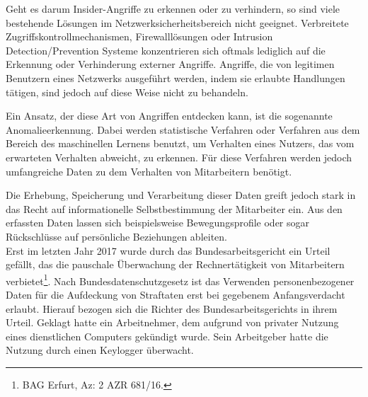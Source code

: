 
Geht es darum Insider-Angriffe zu erkennen oder zu verhindern, so sind viele bestehende Lösungen im Netzwerksicherheitsbereich nicht geeignet. Verbreitete Zugriffskontrollmechanismen, Firewalllösungen oder Intrusion Detection/Prevention Systeme konzentrieren sich oftmals lediglich auf die Erkennung oder Verhinderung externer Angriffe. Angriffe, die von legitimen Benutzern eines Netzwerks ausgeführt werden, indem sie erlaubte Handlungen tätigen, sind jedoch auf diese Weise nicht zu behandeln.

Ein Ansatz, der diese Art von Angriffen entdecken kann, ist die sogenannte Anomalieerkennung. Dabei werden statistische Verfahren oder Verfahren aus dem Bereich des maschinellen Lernens benutzt, um Verhalten eines Nutzers, das vom erwarteten Verhalten abweicht, zu erkennen. 
Für diese Verfahren werden jedoch umfangreiche Daten zu dem Verhalten von Mitarbeitern benötigt.


Die Erhebung, Speicherung und Verarbeitung dieser Daten greift jedoch stark in das Recht auf informationelle Selbstbestimmung der Mitarbeiter ein. Aus den erfassten Daten lassen sich  beispielsweise Bewegungsprofile oder sogar Rückschlüsse auf persönliche Beziehungen ableiten.\\
Erst im letzten Jahr 2017 wurde durch das Bundesarbeitsgericht ein Urteil gefällt, das die pauschale Überwachung der Rechnertätigkeit von Mitarbeitern verbietet\footnote{
  BAG Erfurt, Az: 2 AZR 681/16.
}. Nach Bundesdatenschutzgesetz ist das Verwenden personenbezogener Daten für die Aufdeckung von Straftaten erst bei gegebenem Anfangsverdacht erlaubt. Hierauf bezogen sich die Richter des Bundesarbeitsgerichts in ihrem Urteil. Geklagt hatte ein Arbeitnehmer, dem aufgrund von privater Nutzung eines dienstlichen Computers gekündigt wurde. Sein Arbeitgeber hatte die Nutzung durch einen Keylogger überwacht. 


